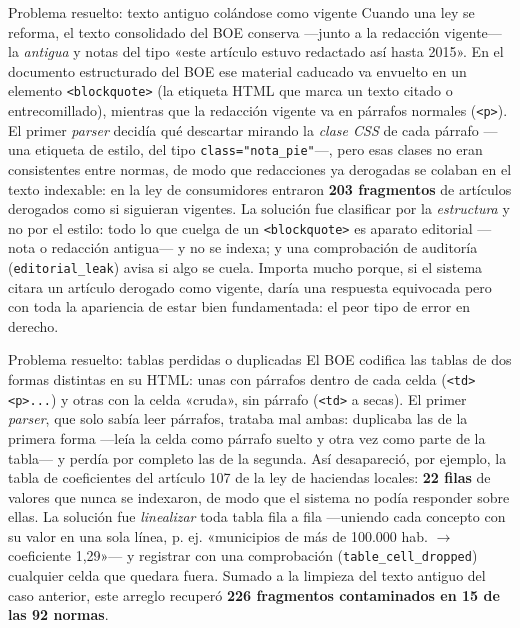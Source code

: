 \begin{myredbox}{Problema resuelto: texto antiguo colándose como vigente}
Cuando una ley se reforma, el texto consolidado del BOE conserva —junto a la redacción vigente— la \emph{antigua} y notas del tipo «este artículo estuvo redactado así hasta 2015». En el documento estructurado del BOE ese material caducado va envuelto en un elemento \texttt{<blockquote>} (la etiqueta HTML que marca un texto citado o entrecomillado), mientras que la redacción vigente va en párrafos normales (\texttt{<p>}). El primer \emph{parser} decidía qué descartar mirando la \emph{clase CSS} de cada párrafo —una etiqueta de estilo, del tipo \texttt{class="nota\_pie"}—, pero esas clases no eran consistentes entre normas, de modo que redacciones ya derogadas se colaban en el texto indexable: en la ley de consumidores entraron \textbf{203 fragmentos} de artículos derogados como si siguieran vigentes. La solución fue clasificar por la \emph{estructura} y no por el estilo: todo lo que cuelga de un \texttt{<blockquote>} es aparato editorial —nota o redacción antigua— y no se indexa; y una comprobación de auditoría (\texttt{editorial\_leak}) avisa si algo se cuela. Importa mucho porque, si el sistema citara un artículo derogado como vigente, daría una respuesta equivocada pero con toda la apariencia de estar bien fundamentada: el peor tipo de error en derecho.
\end{myredbox}



\begin{myredbox}{Problema resuelto: tablas perdidas o duplicadas}
El BOE codifica las tablas de dos formas distintas en su HTML: unas con párrafos dentro de cada celda (\texttt{<td><p>...}) y otras con la celda «cruda», sin párrafo (\texttt{<td>} a secas). El primer \emph{parser}, que solo sabía leer párrafos, trataba mal ambas: duplicaba las de la primera forma —leía la celda como párrafo suelto y otra vez como parte de la tabla— y perdía por completo las de la segunda. Así desapareció, por ejemplo, la tabla de coeficientes del artículo 107 de la ley de haciendas locales: \textbf{22 filas} de valores que nunca se indexaron, de modo que el sistema no podía responder sobre ellas. La solución fue \emph{linealizar} toda tabla fila a fila —uniendo cada concepto con su valor en una sola línea, p. ej. «municipios de más de 100.000 hab. $\rightarrow$ coeficiente 1,29»— y registrar con una comprobación (\texttt{table\_cell\_dropped}) cualquier celda que quedara fuera. Sumado a la limpieza del texto antiguo del caso anterior, este arreglo recuperó \textbf{226 fragmentos contaminados en 15 de las 92 normas}.
\end{myredbox}



